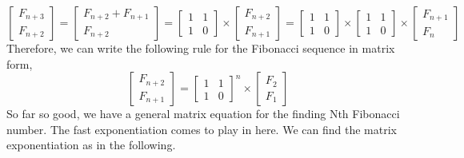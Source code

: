 \documentclass[12pt]{article}
\begin{document}
\[
\begin{bmatrix}
    F_{n+3}\\
    F_{n+2}
\end{bmatrix}
= 
\begin{bmatrix}
    F_{n+2} + F_{n+1}\\
    F_{n+2}
\end{bmatrix}
=
\begin{bmatrix} 
    1 & 1  \\
    1 & 0
\end{bmatrix}
\times
\begin{bmatrix}
    F_{n+2} \\
    F_{n+1}
\end{bmatrix}
=
\begin{bmatrix} 
    1 & 1  \\
    1 & 0
\end{bmatrix}
\times
\begin{bmatrix} 
    1 & 1  \\
    1 & 0
\end{bmatrix}
\times
\begin{bmatrix}
    F_{n+1} \\
    F_{n}
\end{bmatrix}
\]
Therefore, we can write the following rule for the Fibonacci sequence in matrix form,
\[ \begin{bmatrix}
    F_{n+2}\\
    F_{n+1}
\end{bmatrix}
=
\begin{bmatrix}
    1 & 1  \\
    1 & 0
\end{bmatrix}^{n}
\times
\begin{bmatrix}
    F_2 \\
    F_1
\end{bmatrix} \]
So far so good, we have a general matrix equation for the finding Nth Fibonacci number. The fast exponentiation comes to play in here. We can find the matrix exponentiation as in the following.
\end{document}
